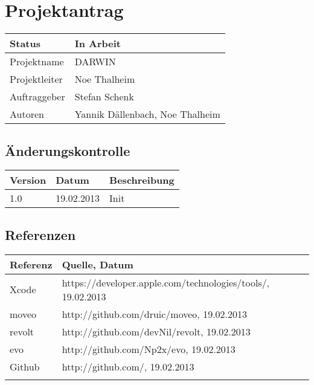 \documentclass{scrartcl}
\begin{document}
	\section*{Projektantrag}
	
	\begin{tabularx}{\textwidth}{| X | X |}
	\hline
	Status & In Arbeit\\
	\hline
	Projektname & DARWIN\\
	\hline
	Projektleiter & Noe Thalheim\\
	\hline
	Auftraggeber & Stefan Schenk\\
	\hline
	Autoren & Yannik Dällenbach, Noe Thalheim\\
	\hline
	\end{tabularx}
	
	\subsection*{Änderungskontrolle}
	\begin{tabularx}{\textwidth}{| X | X | X |}
	\hline
	\rowcolor[gray]{0.9} Version & Datum & Beschreibung\\
	\hline
	1.0 & 19.02.2013 & Init\\
	\hline
	\end{tabularx}

	\subsection*{Referenzen}
	
	\begin{tabular}{| l | l | }
	\hline
	\rowcolor[gray]{0.9} Referenz & Quelle, Datum\\
	\hline
	Xcode & https://developer.apple.com/technologies/tools/, 19.02.2013\\
	\hline
	moveo & http://github.com/druic/moveo, 19.02.2013\\
	\hline
	revolt & http://github.com/devNil/revolt, 19.02.2013\\
	\hline
	evo & http://github.com/Np2x/evo, 19.02.2013\\
	\hline
	Github & http://github.com/, 19.02.2013\\
	\hline
	 & \\
	\hline
	\end{tabular}
	
	\pagebreak
	\tableofcontents
	\pagebreak
	
	
	
	
	
	
	
	
	
\end{document}
